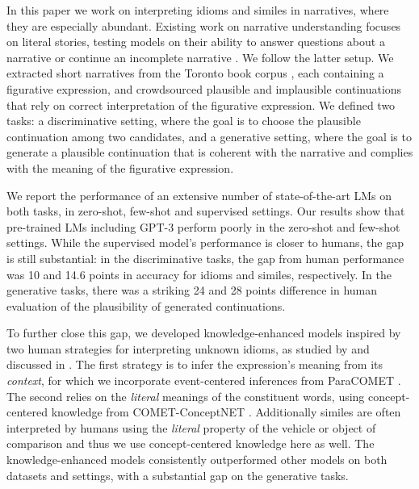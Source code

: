 In this paper we work on interpreting idioms and similes in narratives, where they are especially abundant. Existing work on narrative understanding focuses on literal stories, testing models on their ability to answer questions about a narrative \cite{kocisky-etal-2018-narrativeqa} or continue an incomplete narrative \cite[Story Cloze Test;][]{mostafazadeh-etal-2016-corpus}. We follow the latter setup. We extracted short narratives from the Toronto book corpus \cite{zhu2015aligning}, each containing a figurative expression, and crowdsourced plausible and implausible continuations that rely on correct interpretation of the figurative expression. We defined two tasks: a discriminative setting, where the goal is to choose the plausible continuation among two candidates, and a generative setting, where the goal is to generate a plausible continuation that is coherent with the narrative and complies with the meaning of the figurative expression. 

We report the performance of an extensive number of state-of-the-art LMs on both tasks, in zero-shot, few-shot and supervised settings. Our results show that pre-trained LMs including GPT-3 \cite{brown2020language} perform poorly in the zero-shot and few-shot settings. While the supervised model's performance is closer to humans, the gap is still substantial: in the discriminative tasks, the gap from human performance was 10 and 14.6 points in accuracy for idioms and similes, respectively. In the generative tasks, there was a striking 24 and 28 points difference in human evaluation of the plausibility of generated continuations. 

To further close this gap, we developed knowledge-enhanced models inspired by two human strategies for interpreting unknown idioms, as studied by  and discussed in . The first strategy is to infer the expression's meaning from its \emph{context}, for which we incorporate event-centered inferences from ParaCOMET \cite{gabriel-etal-2021-discourse}. The second relies on the \emph{literal} meanings of the constituent words, using concept-centered knowledge from COMET-ConceptNET \cite{Hwang2021COMETATOMIC2O}. Additionally similes are often interpreted by humans using the \emph{literal} property of the vehicle or object of comparison and thus we use concept-centered knowledge here as well. The knowledge-enhanced models consistently outperformed other models on both datasets and settings, with a substantial gap on the generative tasks. 

